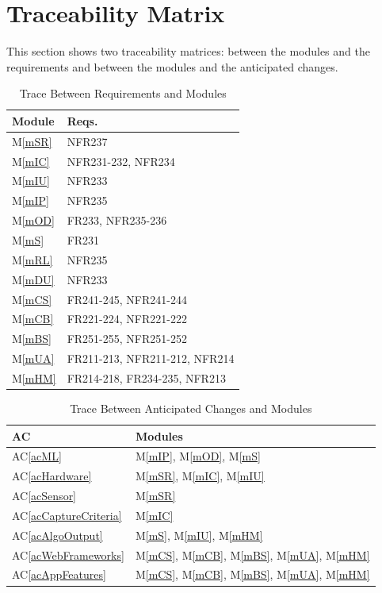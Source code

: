 \documentclass[12pt, titlepage]{article}
\newcommand{\acref}[1]{AC\ref{#1}}
\newcommand{\mref}[1]{M\ref{#1}}
\begin{document}
\section{Traceability Matrix} \label{SecTM}

This section shows two traceability matrices: between the modules and the
requirements and between the modules and the anticipated changes.

\begin{table}[H]
\centering
\begin{tabular}{p{} p{}}
\toprule
\textbf{Module} & \textbf{Reqs.}\\
\midrule
\mref{mSR} & NFR237\\
\mref{mIC} & NFR231-232, NFR234\\
\mref{mIU} & NFR233\\
\mref{mIP} & NFR235\\
\mref{mOD} & FR233, NFR235-236\\
\mref{mS} & FR231\\
\mref{mRL} & NFR235\\
\mref{mDU} & NFR233\\
\mref{mCS} & FR241-245, NFR241-244\\
\mref{mCB} & FR221-224, NFR221-222\\
\mref{mBS} & FR251-255, NFR251-252\\
\mref{mUA} & FR211-213, NFR211-212, NFR214 \\
\mref{mHM} & FR214-218, FR234-235, NFR213 \\

\bottomrule
\end{tabular}
\caption{Trace Between Requirements and Modules}
\label{TblRT}
\end{table}

\begin{table}[H]
\centering
\begin{tabular}{p{} p{}}
\toprule
\textbf{AC} & \textbf{Modules}\\
\midrule
\acref{acML} & \mref{mIP}, \mref{mOD}, \mref{mS} \\
\acref{acHardware} & \mref{mSR}, \mref{mIC}, \mref{mIU} \\
\acref{acSensor} & \mref{mSR} \\
\acref{acCaptureCriteria} & \mref{mIC} \\
\acref{acAlgoOutput} & \mref{mS}, \mref{mIU}, \mref{mHM} \\
\acref{acWebFrameworks} & \mref{mCS}, \mref{mCB}, \mref{mBS}, \mref{mUA}, \mref{mHM} \\
\acref{acAppFeatures} & \mref{mCS}, \mref{mCB}, \mref{mBS}, \mref{mUA}, \mref{mHM} \\
\bottomrule
\end{tabular}
\caption{Trace Between Anticipated Changes and Modules}
\label{TblACT}
\end{table}
\end{document}
